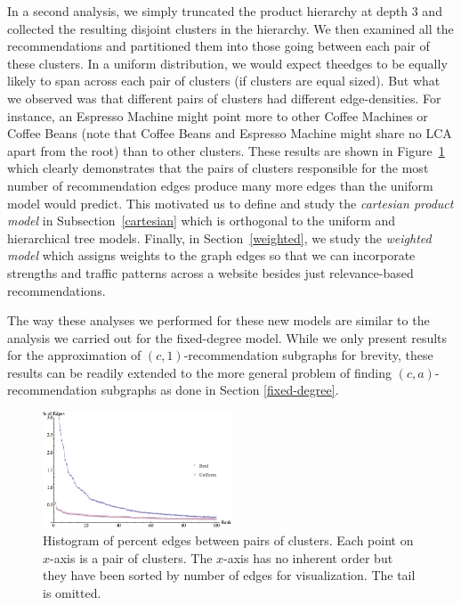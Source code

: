  In a second analysis, we simply truncated the product hierarchy
at depth 3 and collected the resulting disjoint clusters in the
hierarchy. We then examined all the recommendations and partitioned
them into those going between each pair of these clusters. In a
uniform distribution, we would expect theedges to be equally likely
to span across each pair of clusters (if clusters are equal
sized). But what we observed was that different pairs of clusters
had different edge-densities. For instance, an Espresso Machine might
point more to other Coffee Machines or Coffee Beans (note that
Coffee Beans and Espresso Machine might share no LCA apart from the
root) than to other clusters. These results are shown in
Figure~\ref{fig:cart-emp} which clearly demonstrates that the pairs of
clusters responsible for the most number of recommendation edges
produce many more edges than the uniform model would predict.  This
motivated us to define and study the {\em cartesian product model} in
Subsection~\ref{cartesian} which is orthogonal to the uniform and
hierarchical tree models. Finally, in Section~\ref{weighted}, we study
the {\em weighted model}
 which assigns weights to the graph edges so
that we can incorporate strengths and traffic
 patterns across a
website besides just relevance-based recommendations.

The way these analyses we performed for these new models are similar to the
analysis we carried out for the fixed-degree model. While we only present
results for the approximation of $(c,1)$-recommendation subgraphs for brevity, 
these results can be readily extended to the more general problem of finding
$(c,a)$-recommendation subgraphs as done in Section \ref{fixed-degree}.

\begin{figure}
\centering
\includegraphics[width=0.5\textwidth]{images/cartesian_histogram.png}
\begin{minipage}{1\textwidth}
\caption{Histogram of percent edges between pairs of clusters. Each point on $x$-axis is a pair of clusters. The $x$-axis has no inherent order but they have been sorted by number of edges for visualization. The tail is omitted.}
\label{fig:cart-emp}
\vspace{-0.2in}
\end{minipage}
\end{figure}

